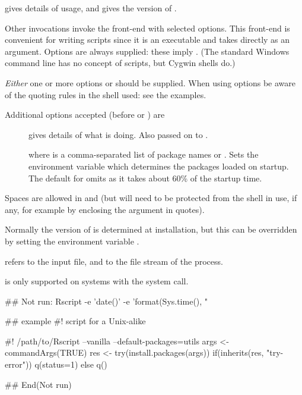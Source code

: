 %
\begin{Details}\relax
{} gives details of usage, and
 gives the version of .

Other invocations invoke the \R{} front-end with selected options.  This
front-end is convenient for writing \samp{\#!} scripts since it is an
executable and takes  directly as an argument.  Options
 are always supplied: these imply
.  (The standard Windows command line has no concept
of \samp{\#!} scripts, but Cygwin shells do.)

\emph{Either} one or more  options or  should
be supplied.  When using  options be aware of the quoting
rules in the shell used: see the examples.

Additional options accepted (before  or ) are
\begin{description}

\item[] gives details of what  is
doing.  Also passed on to \R{}.
\item[] where  is a
comma-separated list of package names or .  Sets the
environment variable  which determines the
packages loaded on startup.  The default for 
omits  as it takes about 60\% of the startup time.


\end{description}


Spaces are allowed in  and  (but will need
to be protected from the shell in use, if any, for example by
enclosing the argument in quotes).

Normally the version of \R{} is determined at installation, but this can
be overridden by setting the environment variable .

 refers to the input file, and
 to the  file stream of the
process.
\end{Details}
%
\begin{Note}\relax
{} is only supported on systems with the 
system call.
\end{Note}
%
\begin{Examples}
\begin{ExampleCode}
## Not run: 
Rscript -e 'date()' -e 'format(Sys.time(), "%

## example #! script for a Unix-alike

#! /path/to/Rscript --vanilla --default-packages=utils
args <- commandArgs(TRUE)
res <- try(install.packages(args))
if(inherits(res, "try-error")) q(status=1) else q()


## End(Not run)
\end{ExampleCode}
\end{Examples}
